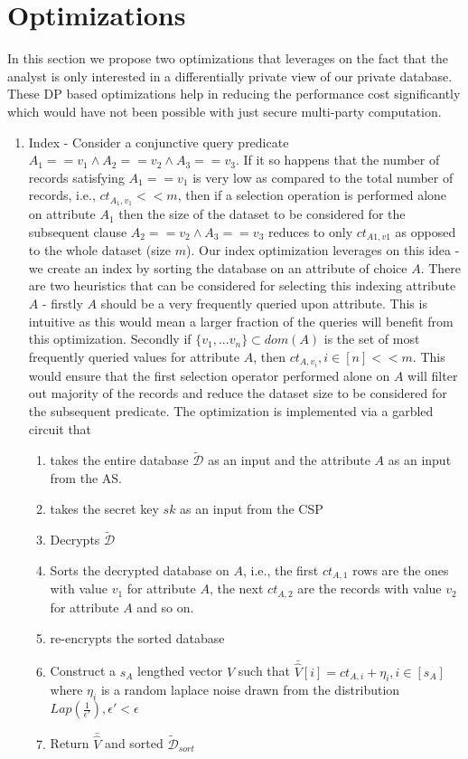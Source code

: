 \section{Optimizations}
In this section we propose two optimizations that leverages on the fact that the analyst is only interested in a  differentially private view of our private database. These DP based optimizations help in reducing the performance cost significantly which would have not been possible with just secure multi-party computation.
\begin{enumerate}
\item Index - Consider a conjunctive query predicate $A_1==v_1 \wedge A_2==v_2 \wedge A_3==v_3 $. If it so happens that the number of records satisfying $A_1==v_1$ is very low as compared to the total number of records, i.e., $ct_{A_1,v_1} << m$, then if a selection operation is performed alone on attribute $A_1$ then the size of the dataset to be considered for the subsequent clause $A_2==v_2 \wedge A_3==v_3$ reduces to only $ct_{A1,v1}$ as opposed to the whole dataset (size $m$). Our index optimization leverages on this idea - we create an index by sorting the database on an attribute of choice $A$. There are two heuristics that can be considered for selecting this indexing attribute $A$ - firstly $A$ should be a very frequently queried upon attribute. This is intuitive as this would mean a larger fraction of the queries will benefit from this optimization. Secondly if $\{v_1,...v_n\} \subset dom(A)$ is the set of most frequently queried values for attribute $A$, then $ct_{A,v_i}, i \in [n] << m$. This would ensure that the first selection operator performed alone on $A$ will filter out majority of the records and reduce the  dataset size to be considered for the subsequent predicate. The optimization is implemented via a garbled circuit that \begin{enumerate}\item takes the entire database $\boldsymbol{\mathcal{\tilde{D}}}$ as an input and the attribute $A$ as an input from the AS.
\item takes the secret key $sk$ as an input from  the CSP \item Decrypts $\boldsymbol{\mathcal{\tilde{D}}}$ \item Sorts the decrypted database on $A$, i.e., the first $ct_{A,1}$ rows are the ones with value $v_1$ for attribute $A$, the next $ct_{A,2}$ are  the records with value $v_2$ for attribute $A$ and so on. \item  re-encrypts the sorted database \item Construct a $s_A$ lengthed vector $\hat{V}$ such that $\bar{\hat{V}}[i]=ct_{A,i}+\eta_i, i \in [s_A]$ where $\eta_i$ is a random laplace noise drawn from the distribution $Lap(\frac{1}{\epsilon'}), \epsilon' < \epsilon $ \item Return $\bar{\hat{V}}$ and sorted $\boldsymbol{\mathcal{\tilde{D}}}_{sort}$\end{enumerate}

\end{enumerate}
